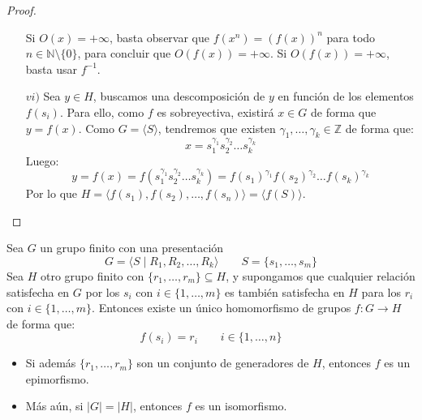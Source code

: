 \begin{prop}
\begin{proof}
\begin{enumerate}
                Si $O(x)=+\infty$, basta observar que $f(x^n) = {(f(x))}^{n}$ para todo $n\in \mathbb{N}\setminus\{0\}$, para concluir que $O(f(x))=+\infty$. Si $O(f(x))=+\infty$, basta usar $f^{-1}$.
            \item[$vi)$] Sea $y\in H$, buscamos una descomposición de $y$ en función de los elementos $f(s_i)$. Para ello, como $f$ es sobreyectiva, existirá $x\in G$ de forma que $y = f(x)$. Como $G=\langle S \rangle $, tendremos que existen $\gamma_1,\ldots,\gamma_k \in \mathbb{Z}$ de forma que:
                \begin{equation*}
                    x = s_1^{\gamma_1}s_2^{\gamma_2}\ldots s_k^{\gamma_k}
                \end{equation*}
                Luego:
                \begin{equation*}
                    y = f(x) = f(s_1^{\gamma_1}s_2^{\gamma_2}\ldots s_k^{\gamma_k}) = {f(s_1)}^{\gamma_1}{f(s_2)}^{\gamma_2} \ldots {f(s_k)}^{\gamma_k}
                \end{equation*}
                Por lo que $H = \langle f(s_1),f(s_2),\ldots,f(s_n) \rangle = \langle f(S) \rangle $.
        \end{enumerate}
    \end{proof}
\end{prop}

\begin{teo}[de Dyck]\label{teo:Dyck}
    Sea $G$ un grupo finito con una presentación
    \begin{equation*}
        G = \langle S\mid R_1,R_2,\ldots,R_k \rangle \qquad S = \{s_1,\ldots,s_m\}
    \end{equation*}
    Sea $H$ otro grupo finito con $\{r_1,\ldots,r_m\}\subseteq H$, y supongamos que cualquier relación satisfecha en $G$ por los $s_i$ con $i \in \{1,\ldots,m\}$ es también satisfecha en $H$ para los $r_i$ con $i \in \{1,\ldots,m\}$. Entonces existe un único homomorfismo de grupos $f:G\to H$ de forma que:
    \begin{equation*}
        f(s_i) = r_i \qquad i \in \{1,\ldots,n\}
    \end{equation*}
    \begin{itemize}
        \item Si además $\{r_1,\ldots,r_m\}$ son un conjunto de generadores de $H$, entonces $f$ es un epimorfismo.
        \item Más aún, si $|G| = |H|$, entonces $f$ es un isomorfismo.
    \end{itemize}
\end{teo}


